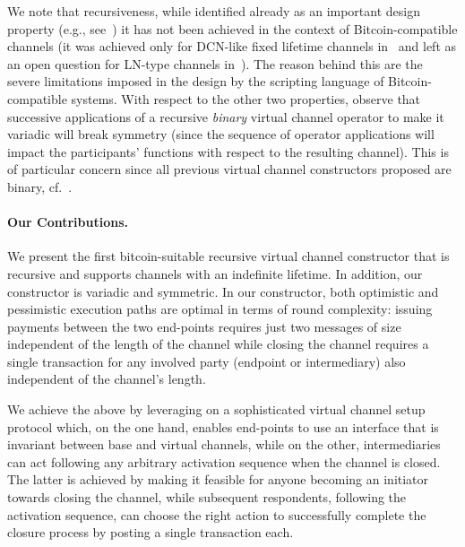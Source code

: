 We note that recursiveness, while identified already as an important design property (e.g., see~\cite{DBLP:conf/ccs/DziembowskiFH18}) it has not been achieved in the context of Bitcoin-compatible channels 
(it was achieved only for DCN-like fixed lifetime channels in~\cite{10.1007/978-3-030-65411-5_18} and left as an open question for LN-type channels in~\cite{cryptoeprint:2020:554}). 
The reason behind this are the severe limitations imposed in the design by the scripting language of Bitcoin-compatible systems. 
%
With respect to the other two properties, observe that successive applications of a recursive {\em binary} virtual channel operator to make it variadic will break symmetry (since the sequence of operator applications will impact the participants' functions with respect to the resulting channel). This is of particular concern since all previous virtual channel constructors proposed are binary, cf.~\cite{DBLP:conf/ccs/DziembowskiFH18,cryptoeprint:2020:554,10.1007/978-3-030-65411-5_18}. 

\paragraph{Our Contributions.}  We present  the first  bitcoin-suitable recursive virtual channel constructor that is recursive and supports channels with an indefinite lifetime. In addition, our constructor is variadic and symmetric. In our constructor, both optimistic and pessimistic execution paths are optimal in terms of round complexity: issuing payments between the two end-points requires just two messages of size independent of the length of the channel while
closing the channel requires a single transaction for any involved party (endpoint or intermediary) also independent of the channel's length. 

We achieve the above by leveraging on a sophisticated virtual channel setup protocol which, on the one hand, enables end-points to use an interface that is invariant between base and virtual channels, 
while on the other, intermediaries can act following any arbitrary activation sequence when the channel is closed. The latter is achieved by making it feasible for anyone becoming an initiator towards closing the channel, while subsequent respondents, following the activation sequence, can choose the right action to successfully complete the closure process by posting a single transaction each. 

